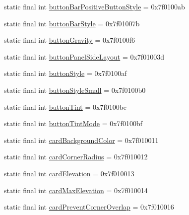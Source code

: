 \begin{CompactItemize}
\item 
static final int \hyperlink{classandroid_1_1support_1_1graphics_1_1drawable_1_1_r_1_1attr_28155cc159c9e4e1502ba7c671477125}{buttonBarPositiveButtonStyle} = 0x7f0100ab
\item 
static final int \hyperlink{classandroid_1_1support_1_1graphics_1_1drawable_1_1_r_1_1attr_351f2a8e2bcb5f52aeb9ca82e4201490}{buttonBarStyle} = 0x7f01007b
\item 
static final int \hyperlink{classandroid_1_1support_1_1graphics_1_1drawable_1_1_r_1_1attr_a7207aa3459f14eabcee14ae07694677}{buttonGravity} = 0x7f0100f6
\item 
static final int \hyperlink{classandroid_1_1support_1_1graphics_1_1drawable_1_1_r_1_1attr_46acaf0b137e8348f7e5b8a422e40ade}{buttonPanelSideLayout} = 0x7f01003d
\item 
static final int \hyperlink{classandroid_1_1support_1_1graphics_1_1drawable_1_1_r_1_1attr_a7356cb50d9e8c7b2e91b4571c501056}{buttonStyle} = 0x7f0100af
\item 
static final int \hyperlink{classandroid_1_1support_1_1graphics_1_1drawable_1_1_r_1_1attr_afff50c3310c835a809ab8d74569d32e}{buttonStyleSmall} = 0x7f0100b0
\item 
static final int \hyperlink{classandroid_1_1support_1_1graphics_1_1drawable_1_1_r_1_1attr_ef0f57c4c59173040d0780da73d1d7b3}{buttonTint} = 0x7f0100be
\item 
static final int \hyperlink{classandroid_1_1support_1_1graphics_1_1drawable_1_1_r_1_1attr_bfd86900ae8f7fd6ba1f69dc6069b0ac}{buttonTintMode} = 0x7f0100bf
\item 
static final int \hyperlink{classandroid_1_1support_1_1graphics_1_1drawable_1_1_r_1_1attr_728faebb8f2fa52aa186fb6e10737f84}{cardBackgroundColor} = 0x7f010011
\item 
static final int \hyperlink{classandroid_1_1support_1_1graphics_1_1drawable_1_1_r_1_1attr_51dfa632eb182abcdc702acd54e16c5a}{cardCornerRadius} = 0x7f010012
\item 
static final int \hyperlink{classandroid_1_1support_1_1graphics_1_1drawable_1_1_r_1_1attr_9a5cb4675e7d2e197e4139247ef01257}{cardElevation} = 0x7f010013
\item 
static final int \hyperlink{classandroid_1_1support_1_1graphics_1_1drawable_1_1_r_1_1attr_fe983c9814a7340660c1d6e7b4af17df}{cardMaxElevation} = 0x7f010014
\item 
static final int \hyperlink{classandroid_1_1support_1_1graphics_1_1drawable_1_1_r_1_1attr_571a6bee8997bdfec9918930b50dbb41}{cardPreventCornerOverlap} = 0x7f010016

\end{CompactItemize}
